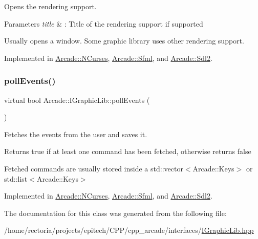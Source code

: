 Opens the rendering support. 


\begin{DoxyParams}{Parameters}
{\em title} & \+: Title of the rendering support if supported\\
\hline
\end{DoxyParams}
Usually opens a window. Some graphic library uses other rendering support. 

Implemented in \hyperlink{class_arcade_1_1_n_curses_a2bebb6d17c26471866a4403c64cda006}{Arcade\+::\+N\+Curses}, \hyperlink{class_arcade_1_1_sfml_a9a868d1964ac2f24327329af971fdb57}{Arcade\+::\+Sfml}, and \hyperlink{class_arcade_1_1_sdl2_aa7000a687e79acf5e5ff99ae6e71194b}{Arcade\+::\+Sdl2}.

\mbox{\label{class_arcade_1_1_i_graphic_lib_a6be852f0395f08943f988c6823b80937}} 
\subsubsection{\texorpdfstring{poll\+Events()}{pollEvents()}}
{\footnotesize\ttfamily virtual bool Arcade\+::\+I\+Graphic\+Lib\+::poll\+Events (\begin{DoxyParamCaption}{ }\end{DoxyParamCaption})\hspace{0.3cm}{\ttfamily [pure virtual]}}



Fetches the events from the user and saves it. 

\begin{DoxyReturn}{Returns}
true if at least one command has been fetched, otherwise returns false
\end{DoxyReturn}
Fetched commands are usually stored inside a std\+::vector$<$\+Arcade\+::\+Keys$>$ or std\+::list$<$\+Arcade\+::\+Keys$>$ 

Implemented in \hyperlink{class_arcade_1_1_n_curses_ae250fb39f3e256bef0492fd54ebdaee7}{Arcade\+::\+N\+Curses}, \hyperlink{class_arcade_1_1_sfml_a7b5fe6ccf84db8b3f2897805c965e607}{Arcade\+::\+Sfml}, and \hyperlink{class_arcade_1_1_sdl2_af794699db9401d1be49566908ec7bced}{Arcade\+::\+Sdl2}.



The documentation for this class was generated from the following file\+:\begin{DoxyCompactItemize}
\item 
/home/rectoria/projects/epitech/\+C\+P\+P/cpp\+\_\+arcade/interfaces/\hyperlink{_i_graphic_lib_8hpp}{I\+Graphic\+Lib.\+hpp}\end{DoxyCompactItemize}
